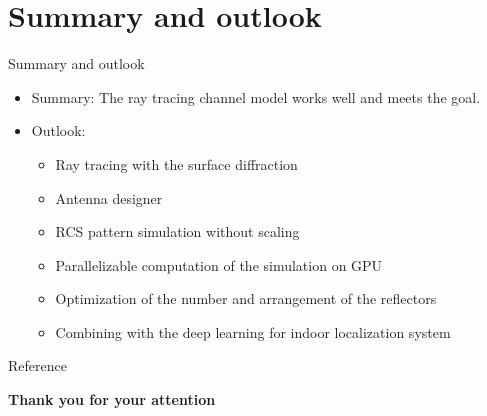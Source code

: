 \documentclass{beamer}
\newcounter{section}
\begin{document}
\section{Summary and outlook}
\begin{frame}[t]{Summary and outlook}
	\begin{itemize}
	    \item Summary: The ray tracing channel model works well and meets the goal.
        \vspace{0.5\baselineskip}
        \item Outlook:
        \vspace{0.5\baselineskip}
        \begin{itemize}
            \item Ray tracing with the surface diffraction
            \vspace{0.5\baselineskip}
            \item Antenna designer
            \vspace{0.5\baselineskip}
            \item RCS pattern simulation without scaling
            \vspace{0.5\baselineskip}
            \item Parallelizable computation of the simulation on GPU
            \vspace{0.5\baselineskip}
            \item Optimization of the number and arrangement of the reflectors
            \vspace{0.5\baselineskip}
            \item Combining with the deep learning for indoor localization system
        \end{itemize}
        
	\end{itemize}
\end{frame}



\renewcommand*{\bibfont}{\scriptsize}
\begin{frame}[t]{Reference}
    \printbibliography{}
\end{frame}




\begin{frame}[t]
    \centering
    \fontsize{30}{120}\selectfont
	\textbf{Thank you for your attention}
\end{frame}

\end{document}
